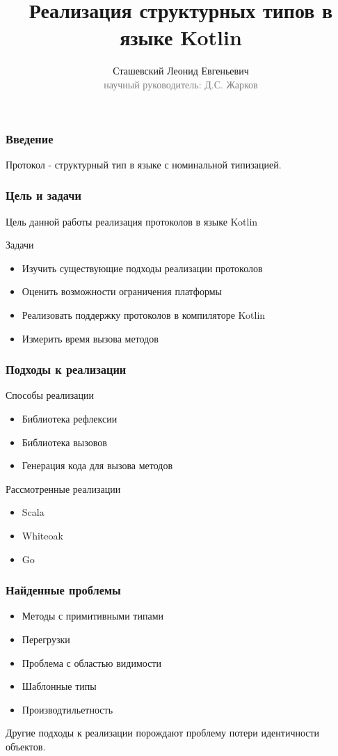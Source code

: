 \documentclass{beamer}
\begin{document}
\title[Структурный типы в языке Kotlin]{Реализация структурных типов в языке Kotlin}
\author[Сташевский Л.Е.]{Сташевский Леонид Евгеньевич\\{\footnotesize\textcolor{gray}{научный руководитель: Д.С. Жарков}}}
\frame{\titlepage}

\begin{frame}\frametitle{Введение}
Протокол - структурный тип в языке с номинальной типизацией.
\end{frame}

\begin{frame}\frametitle{Цель и задачи}
Цель данной работы реализация протоколов в языке Kotlin

Задачи 
\begin{itemize}
    \item Изучить существующие подходы реализации протоколов
    \item Оценить возможности ограничения платформы
    \item Реализовать поддержку протоколов в компиляторе Kotlin
    \item Измерить время вызова методов
\end{itemize}
\end{frame}


\begin{frame}\frametitle{Подходы к реализации}
Способы реализации
\begin{itemize}
    \item Библиотека рефлексии
    \item Библиотека вызовов
    \item Генерация кода для вызова методов
\end{itemize}
Рассмотренные реализации
\begin{itemize}
    \item Scala
    \item Whiteoak
    \item Go
\end{itemize}
\end{frame}

\begin{frame}\frametitle{Найденные проблемы}
\begin{itemize}
    \item Методы с примитивными типами
    \item Перегрузки
    \item Проблема с областью видимости
    \item Шаблонные типы
    \item Производтильетность
\end{itemize}
Другие подходы к реализации порождают проблему потери идентичности объектов.
\end{frame}
\end{document}
